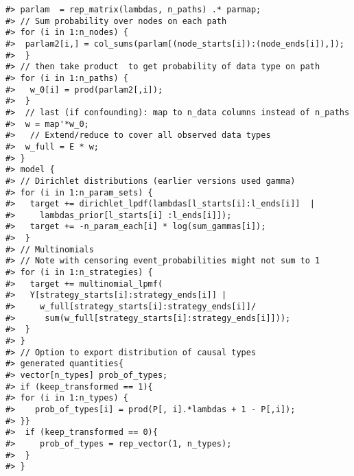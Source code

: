 \documentclass[
  11pt,
  article]{jss}
\begin{document}
\begin{verbatim}
#> parlam  = rep_matrix(lambdas, n_paths) .* parmap;
#> // Sum probability over nodes on each path
#> for (i in 1:n_nodes) {
#>  parlam2[i,] = col_sums(parlam[(node_starts[i]):(node_ends[i]),]);
#>  }
#> // then take product  to get probability of data type on path
#> for (i in 1:n_paths) {
#>   w_0[i] = prod(parlam2[,i]);
#>  }
#>  // last (if confounding): map to n_data columns instead of n_paths
#>  w = map'*w_0;
#>   // Extend/reduce to cover all observed data types
#>  w_full = E * w;
#> }
#> model {
#> // Dirichlet distributions (earlier versions used gamma)
#> for (i in 1:n_param_sets) {
#>   target += dirichlet_lpdf(lambdas[l_starts[i]:l_ends[i]]  |
#>     lambdas_prior[l_starts[i] :l_ends[i]]);
#>   target += -n_param_each[i] * log(sum_gammas[i]);
#>  }
#> // Multinomials
#> // Note with censoring event_probabilities might not sum to 1
#> for (i in 1:n_strategies) {
#>   target += multinomial_lpmf(
#>   Y[strategy_starts[i]:strategy_ends[i]] |
#>     w_full[strategy_starts[i]:strategy_ends[i]]/
#>      sum(w_full[strategy_starts[i]:strategy_ends[i]]));
#>  }
#> }
#> // Option to export distribution of causal types
#> generated quantities{
#> vector[n_types] prob_of_types;
#> if (keep_transformed == 1){
#> for (i in 1:n_types) {
#>    prob_of_types[i] = prod(P[, i].*lambdas + 1 - P[,i]);
#> }}
#>  if (keep_transformed == 0){
#>     prob_of_types = rep_vector(1, n_types);
#>  }
#> }
\end{verbatim}
\end{document}
